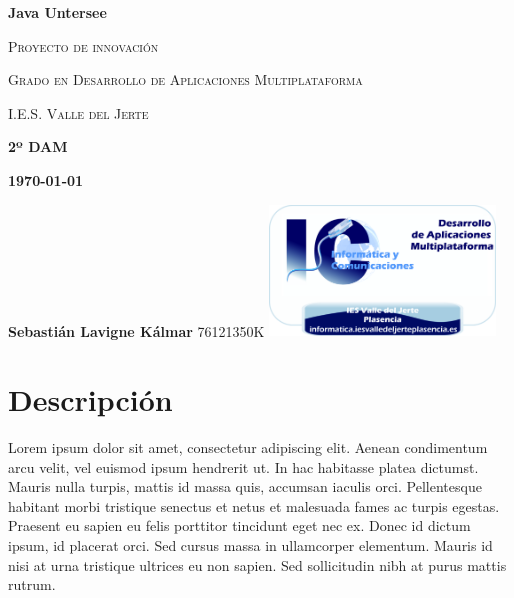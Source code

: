 \documentclass[a4paper,
	11pt,
	parskip=full,
	bibliography=totoc,
	twoside
	]{scrartcl}
\let\oldsection\section
\def\section{\cleardoubleoddpage\oldsection}
\begin{document}
%

\cleardoubleoddpage
\begin{titlepage}
	{\space}
	\vspace{5cm}
	\centering
	{\rmfamily\bfseries\Huge Java Untersee\par}
	\vspace{1.5cm}
	{\rmfamily\scshape\LARGE Proyecto de innovación\par}
	\vspace{1.5cm}
	{\rmfamily\scshape\LARGE Grado en Desarrollo de Aplicaciones Multiplataforma \par}
	\vspace{0.2cm}
	{\rmfamily\scshape\Huge I.E.S. Valle del Jerte \par}
	\vspace{1cm}
	\raggedleft
	\vfill
	{\rmfamily\bfseries\large 2º DAM\linebreak}
	{\rmfamily\bfseries\large\today\par}
	\vspace{1cm}
	{\rmfamily\bfseries\Large Sebastián Lavigne Kálmar\linebreak}
	{76121350K}
	\vfill
	\includegraphics[width=6cm]{img/DAM_iesvallejerteplasencia.png}
	
	
	
\end{titlepage}

\cleardoubleoddpage
\tableofcontents

\doublespacing

\cleardoubleoddpage
\section{Descripción}
\label{sec:descripcion}
	
	
	Lorem ipsum dolor sit amet, consectetur adipiscing elit. Aenean condimentum arcu velit, vel euismod ipsum hendrerit ut. In hac habitasse platea dictumst. Mauris nulla turpis, mattis id massa quis, accumsan iaculis orci. Pellentesque habitant morbi tristique senectus et netus et malesuada fames ac turpis egestas. Praesent eu sapien eu felis porttitor tincidunt eget nec ex. Donec id dictum ipsum, id placerat orci. Sed cursus massa in ullamcorper elementum. Mauris id nisi at urna tristique ultrices eu non sapien. Sed sollicitudin nibh at purus mattis rutrum.
	
\end{document}
